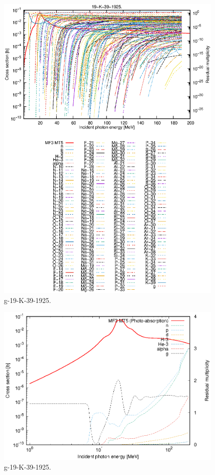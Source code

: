 \begin{figure}
 \includegraphics[width=\linewidth]{eps/g_19-K-39_1925.eps}
  \caption{g-19-K-39-1925.}
\end{figure}
\newpage \clearpage

\begin{figure}
 \includegraphics[width=\linewidth]{eps-log/g_19-K-39_1925.eps}
 \caption{g-19-K-39-1925.}
\end{figure}
\newpage \clearpage

